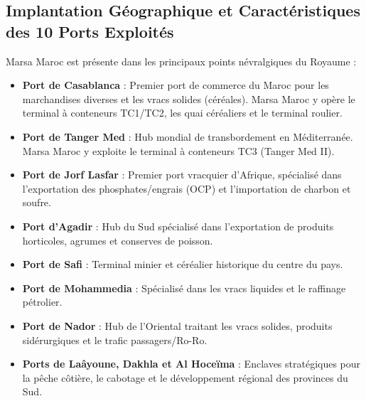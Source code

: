 \documentclass[12pt,a4paper,oneside]{report}
\begin{document}
\subsection{Implantation Géographique et Caractéristiques des 10 Ports Exploités}
Marsa Maroc est présente dans les principaux points névralgiques du Royaume :
\begin{itemize}
    \item \textbf{Port de Casablanca} : Premier port de commerce du Maroc pour les marchandises diverses et les vracs solides (céréales). Marsa Maroc y opère le terminal à conteneurs TC1/TC2, les quai céréaliers et le terminal roulier.
    \item \textbf{Port de Tanger Med} : Hub mondial de transbordement en Méditerranée. Marsa Maroc y exploite le terminal à conteneurs TC3 (Tanger Med II).
    \item \textbf{Port de Jorf Lasfar} : Premier port vracquier d'Afrique, spécialisé dans l'exportation des phosphates/engrais (OCP) et l'importation de charbon et soufre.
    \item \textbf{Port d'Agadir} : Hub du Sud spécialisé dans l'exportation de produits horticoles, agrumes et conserves de poisson.
    \item \textbf{Port de Safi} : Terminal minier et céréalier historique du centre du pays.
    \item \textbf{Port de Mohammedia} : Spécialisé dans les vracs liquides et le raffinage pétrolier.
    \item \textbf{Port de Nador} : Hub de l'Oriental traitant les vracs solides, produits sidérurgiques et le trafic passagers/Ro-Ro.
    \item \textbf{Ports de Laâyoune, Dakhla et Al Hoceïma} : Enclaves stratégiques pour la pêche côtière, le cabotage et le développement régional des provinces du Sud.
\end{itemize}
\end{document}
